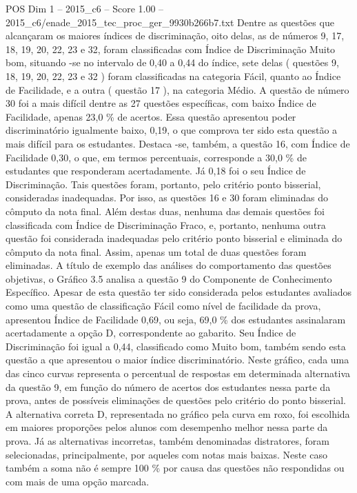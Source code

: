 \begin{textsample}{POS Dim 1 – 2015\_c6 – Score 1.00 – 2015\_c6/enade\_2015\_tec\_proc\_ger\_9930b266b7.txt}
Dentre as questões que alcançaram os maiores índices de discriminação, oito delas, as de números 9, 17, 18, 19, 20, 22, 23 e 32, foram classificadas com Índice de Discriminação Muito bom, situando -se no intervalo de 0,40 a 0,44 do índice, sete delas ( questões 9, 18, 19, 20, 22, 23 e 32 ) foram classificadas na categoria Fácil, quanto ao Índice de Facilidade, e a outra ( questão 17 ), na categoria Médio.
A questão de número 30 foi a mais difícil dentre as 27 questões específicas, com baixo Índice de Facilidade, apenas 23,0 \% de acertos.
Essa questão apresentou poder discriminatório igualmente baixo, 0,19, o que comprova ter sido esta questão a mais difícil para os estudantes.
Destaca -se, também, a questão 16, com Índice de Facilidade 0,30, o que, em termos percentuais, corresponde a 30,0 \% de estudantes que responderam acertadamente.
Já 0,18 foi o seu Índice de Discriminação.
Tais questões foram, portanto, pelo critério ponto bisserial, consideradas inadequadas.
Por isso, as questões 16 e 30 foram eliminadas do cômputo da nota final.
Além destas duas, nenhuma das demais questões foi classificada com Índice de Discriminação Fraco, e, portanto, nenhuma outra questão foi considerada inadequadas pelo critério ponto bisserial e eliminada do cômputo da nota final.
Assim, apenas um total de duas questões foram eliminadas.
A título de exemplo das análises do comportamento das questões objetivas, o Gráfico 3.5 analisa a questão 9 do Componente de Conhecimento Específico.
Apesar de esta questão ter sido considerada pelos estudantes avaliados como uma questão de classificação Fácil como nível de facilidade da prova, apresentou Índice de Facilidade 0,69, ou seja, 69,0 \% dos estudantes assinalaram acertadamente a opção D, correspondente ao gabarito.
Seu Índice de Discriminação foi igual a 0,44, classificado como Muito bom, também sendo esta questão a que apresentou o maior índice discriminatório.
Neste gráfico, cada uma das cinco curvas representa o percentual de respostas em determinada alternativa da questão 9, em função do número de acertos dos estudantes nessa parte da prova, antes de possíveis eliminações de questões pelo critério do ponto bisserial.
A alternativa correta D, representada no gráfico pela curva em roxo, foi escolhida em maiores proporções pelos alunos com desempenho melhor nessa parte da prova.
Já as alternativas incorretas, também denominadas distratores, foram selecionadas, principalmente, por aqueles com notas mais baixas.
Neste caso também a soma não é sempre 100 \% por causa das questões não respondidas ou com mais de uma opção marcada.

\end{textsample}
